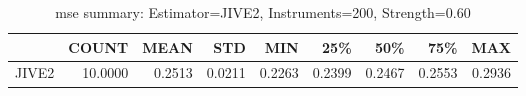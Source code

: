 \begin{table}[ht]
\centering
\caption{mse summary: Estimator=JIVE2, Instruments=200, Strength=0.60}
\begin{tabular}{lrrrrrrrr}
\toprule
 & COUNT & MEAN & STD & MIN & 25\% & 50\% & 75\% & MAX \\
\midrule
JIVE2 & 10.0000 & 0.2513 & 0.0211 & 0.2263 & 0.2399 & 0.2467 & 0.2553 & 0.2936 \\
\bottomrule
\end{tabular}
\end{table}
